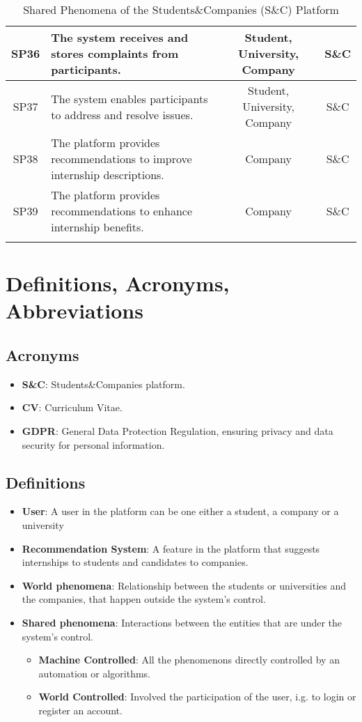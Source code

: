 \begin{longtable}{|c|p{5cm}|c|c|}
SP36 & The system receives and stores complaints from participants. & Student, University, Company & S\&C \\ \hline
SP37 & The system enables participants to address and resolve issues. & Student, University, Company & S\&C \\ \hline

SP38 & The platform provides recommendations to improve internship descriptions. & Company & S\&C \\ \hline
SP39 & The platform provides recommendations to enhance internship benefits. & Company & S\&C \\ \hline


\caption{Shared Phenomena of the Students\&Companies (S\&C) Platform}
\end{longtable}

\newpage

\section{Definitions, Acronyms, Abbreviations}
\subsection{Acronyms}
\begin{itemize}
    \item \textbf{S\&C}: Students\&Companies platform.
    \item \textbf{CV}: Curriculum Vitae.
    \item \textbf{GDPR}: General Data Protection Regulation, ensuring privacy and data security for personal information.
\end{itemize}
\subsection{Definitions}
\begin{itemize}
    \item \textbf{User}: A user in the platform can be one either a student, a company or a university
    \item \textbf{Recommendation System}: A feature in the platform that suggests internships to students and candidates to companies.
    \item \textbf{World phenomena}: Relationship between the students or universities and the companies, that happen outside the system's control.
    \item \textbf{Shared phenomena}: Interactions between the entities that are under the system's control.
    \begin{itemize}
        \item \textbf{Machine Controlled}: All the phenomenons directly controlled by an automation or algorithms.
        \item \textbf{World Controlled}: Involved the participation of the user, i.g. to login or register an account.
    \end{itemize}
\end{itemize}

